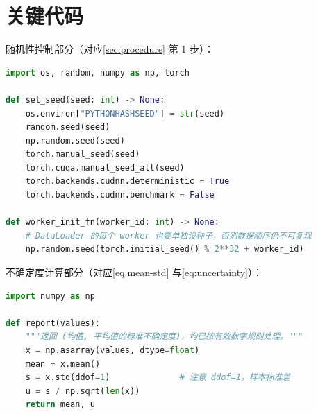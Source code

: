 \section{关键代码}
\label{app:code}

随机性控制部分（对应\cref{sec:procedure} 第 1 步）：

\begin{lstlisting}[language=Python, caption={随机种子的完整设置}, label={lst:seed}]
import os, random, numpy as np, torch

def set_seed(seed: int) -> None:
    os.environ["PYTHONHASHSEED"] = str(seed)
    random.seed(seed)
    np.random.seed(seed)
    torch.manual_seed(seed)
    torch.cuda.manual_seed_all(seed)
    torch.backends.cudnn.deterministic = True
    torch.backends.cudnn.benchmark = False

def worker_init_fn(worker_id: int) -> None:
    # DataLoader 的每个 worker 也要单独设种子，否则数据顺序仍不可复现
    np.random.seed(torch.initial_seed() % 2**32 + worker_id)
\end{lstlisting}

不确定度计算部分（对应\cref{eq:mean-std} 与\cref{eq:uncertainty}）：

\begin{lstlisting}[language=Python, caption={A 类不确定度评定}, label={lst:uncertainty}]
import numpy as np

def report(values):
    """返回 (均值, 平均值的标准不确定度)，均已按有效数字规则处理。"""
    x = np.asarray(values, dtype=float)
    mean = x.mean()
    s = x.std(ddof=1)              # 注意 ddof=1，样本标准差
    u = s / np.sqrt(len(x))
    return mean, u
\end{lstlisting}

